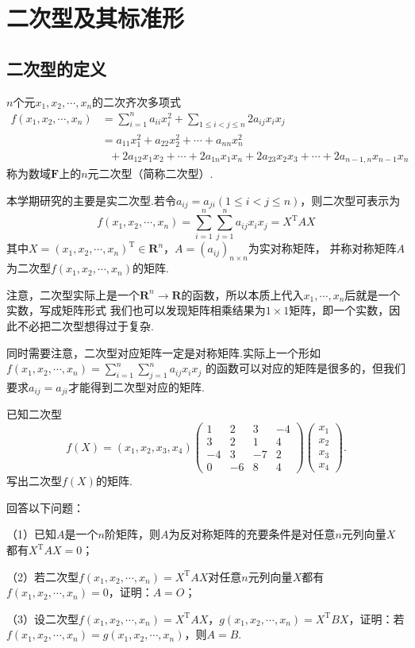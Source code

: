\section{二次型及其标准形}
\subsection{二次型的定义}
\begin{definition}
	$n$个元$x_1,x_2,\cdots,x_n$的二次齐次多项式
	\begin{align*}
		f(x_1,x_2,\cdots,x_n) &= \sum_{i=1}^{n}a_{ii}x_i^2+\sum\limits_{1\le i<j\le n}2a_{ij}x_ix_j \\
							  &= a_{11}x_1^2+a_{22}x_2^2+\cdots+a_{nn}x_n^2 \\
							  &\ \ \ +2a_{12}x_1x_2+\cdots+2a_{1n}x_1x_n+2a_{23}x_2x_3+\cdots+2a_{n-1,n}x_{n-1}x_n
	\end{align*}
	称为数域$\mathbf{F}$上的$n$元二次型（简称二次型）.
\end{definition}
本学期研究的主要是实二次型.若令$a_{ij}=a_{ji}(1\le i<j\le n)$，则二次型可表示为
$$f(x_1,x_2,\cdots,x_n)=\sum_{i=1}^{n}\sum_{j=1}^{n}a_{ij}x_ix_j=X^\mathrm{T}AX$$
其中$X=(x_1,x_2,\cdots,x_n)^\mathrm{T}\in\mathbf{R}^n$，$A=(a_{ij})_{n\times n}$为实对称矩阵，
并称对称矩阵$A$为二次型$f(x_1,x_2,\cdots,x_n)$的矩阵.

注意，二次型实际上是一个$\mathbf{R}^n\to\mathbf{R}$的函数，所以本质上代入$x_1,\cdots,x_n$后就是一个实数，写成矩阵形式
我们也可以发现矩阵相乘结果为$1\times 1$矩阵，即一个实数，因此不必把二次型想得过于复杂.

同时需要注意，二次型对应矩阵一定是对称矩阵.实际上一个形如$f(x_1,x_2,\cdots,x_n)=\sum\limits_{i=1}^{n}\sum\limits_{j=1}^{n}a_{ij}x_ix_j$
的函数可以对应的矩阵是很多的，但我们要求$a_{ij}=a_{ji}$才能得到二次型对应的矩阵.
\begin{example}
	已知二次型
	$$f(X)=(x_1,x_2,x_3,x_4)\begin{pmatrix}
		1 & 2 & 3 & -4 \\ 3 & 2 & 1 & 4 \\ -4 & 3 & -7 & 2 \\ 0 & -6 & 8 & 4
	\end{pmatrix}\begin{pmatrix}
		x_1 \\ x_2 \\ x_3 \\ x_4
	\end{pmatrix}.$$
	写出二次型$f(X)$的矩阵.
\end{example}
\begin{example}
	回答以下问题：

	\textup{（1）}已知$A$是一个$n$阶矩阵，则$A$为反对称矩阵的充要条件是对任意$n$元列向量$X$都有$X^\mathrm{T}AX=0$\textup{；}
	
	\textup{（2）}若二次型$f(x_1,x_2,\cdots,x_n)=X^\mathrm{T}AX$对任意$n$元列向量$X$都有$f(x_1,x_2,\cdots,x_n)=0$，证明：$A=O$\textup{；}
	
	\textup{（3）}设二次型$f(x_1,x_2,\cdots,x_n)=X^\mathrm{T}AX$，$g(x_1,x_2,\cdots,x_n)=X^\mathrm{T}BX$，证明：若$f(x_1,x_2,\cdots,x_n)=
	g(x_1,x_2,\cdots,x_n)$，则$A=B$.
\end{example}
